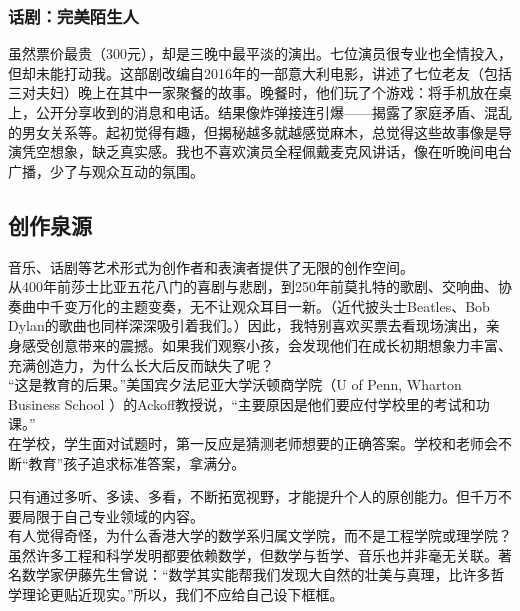 \hypertarget{ux8bddux5267ux5b8cux7f8eux964cux751fux4eba}{%
\subsubsection{话剧：完美陌生人}\label{ux8bddux5267ux5b8cux7f8eux964cux751fux4eba}}

虽然票价最贵（300元），却是三晚中最平淡的演出。七位演员很专业也全情投入，但却未能打动我。这部剧改编自2016年的一部意大利电影，讲述了七位老友（包括三对夫妇）晚上在其中一家聚餐的故事。晚餐时，他们玩了个游戏：将手机放在桌上，公开分享收到的消息和电话。结果像炸弹接连引爆------揭露了家庭矛盾、混乱的男女关系等。起初觉得有趣，但揭秘越多就越感觉麻木，总觉得这些故事像是导演凭空想象，缺乏真实感。我也不喜欢演员全程佩戴麦克风讲话，像在听晚间电台广播，少了与观众互动的氛围。

\hypertarget{ux521bux4f5cux6cc9ux6e90}{%
\subsection{创作泉源}\label{ux521bux4f5cux6cc9ux6e90}}

音乐、话剧等艺术形式为创作者和表演者提供了无限的创作空间。\\
从400年前莎士比亚五花八门的喜剧与悲剧，到250年前莫扎特的歌剧、交响曲、协奏曲中千变万化的主题变奏，无不让观众耳目一新。（近代披头士Beatles、Bob
Dylan的歌曲也同样深深吸引着我们。）因此，我特别喜欢买票去看现场演出，亲身感受创意带来的震撼。如果我们观察小孩，会发现他们在成长初期想象力丰富、充满创造力，为什么长大后反而缺失了呢？\\
``这是教育的后果。''美国宾夕法尼亚大学沃顿商学院（U of Penn, Wharton
Business School
）的Ackoff教授说，``主要原因是他们要应付学校里的考试和功课。''\\
在学校，学生面对试题时，第一反应是猜测老师想要的正确答案。学校和老师会不断``教育''孩子追求标准答案，拿满分。


只有通过多听、多读、多看，不断拓宽视野，才能提升个人的原创能力。但千万不要局限于自己专业领域的内容。\\
有人觉得奇怪，为什么香港大学的数学系归属文学院，而不是工程学院或理学院？虽然许多工程和科学发明都要依赖数学，但数学与哲学、音乐也并非毫无关联。著名数学家伊藤先生曾说：``数学其实能帮我们发现大自然的壮美与真理，比许多哲学理论更贴近现实。''所以，我们不应给自己设下框框。

